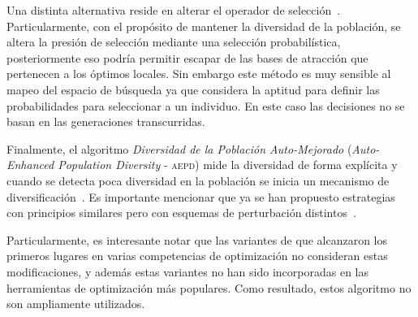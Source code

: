 Una distinta alternativa reside en alterar el operador de selección~\cite{sa2008exploration}.
%
Particularmente, con el propósito de mantener la diversidad de la población, se altera la presión de selección mediante una selección probabilística, posteriormente eso podría permitir escapar de las bases de atracción que pertenecen a los óptimos locales.
%
Sin embargo este método es muy sensible al mapeo del espacio de búsqueda ya que considera la aptitud para definir las probabilidades para seleccionar a un individuo.
%
En este caso las decisiones no se basan en las generaciones transcurridas.

Finalmente, el algoritmo \textit{Diversidad de la Población Auto-Mejorado} (\textit{Auto-Enhanced Population Diversity} - \textsc{aepd}) mide la diversidad de forma explícita y cuando se detecta poca diversidad en la población se inicia un mecanismo de diversificación~\cite{yang2015differential}.
%
Es importante mencionar que ya se han propuesto estrategias con principios similares pero con esquemas de perturbación distintos~\cite{zhao2016differential}.


Particularmente, es interesante notar que las variantes de \DE{} que alcanzaron los primeros lugares en varias competencias de optimización no consideran estas modificaciones, y además estas variantes no han sido incorporadas en las herramientas de optimización más populares.
%
Como resultado, estos algoritmo no son ampliamente utilizados.


